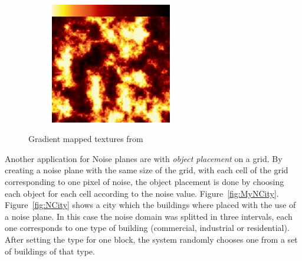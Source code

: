 \begin{figure}
\begin{subfigure}[b]{0.3\textwidth}
                \label{fig:Fbrocoli}
        \end{subfigure}
        ~ %
        \begin{subfigure}[b]{0.3\textwidth}
                \includegraphics[width=\textwidth]{img/Theory/Perlin_Noise/gradient_fire.png}
                \label{fig:Fbrocoli}
        \end{subfigure}
        \caption{Gradient mapped textures from \cite{NoisesGAMES}}
        \label{fig:NTextures}
\end{figure}

Another application for Noise planes are with \emph{object placement} on a grid. By creating a noise plane with the same size of the grid, with each cell of the grid corresponding to one pixel of noise, the object placement is done by choosing each object for each cell according to the noise value. Figure~\ref{fig:MyNCity}.
Figure~\ref{fig:NCity} shows a city which the buildings where placed with the use of a noise plane. In this case the noise domain was splitted in three intervals, each one corresponds to one type of building (commercial, industrial or residential). After setting the type for one block, the system randomly chooses one from a set of buildings of that type.

